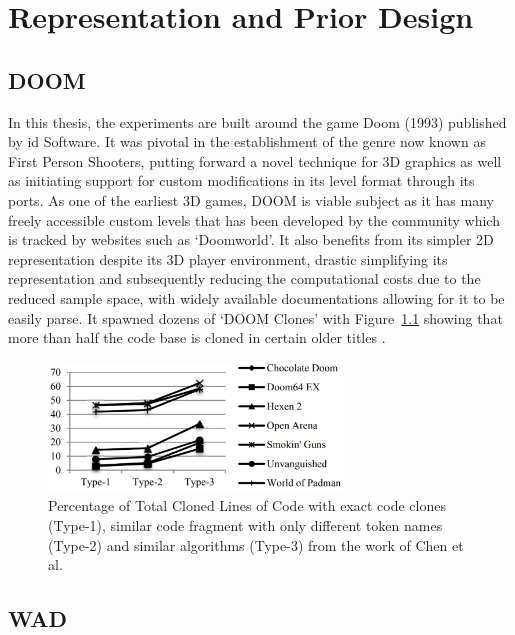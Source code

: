 \documentclass{Configuration_Files/PoliMi3i_thesis}
\begin{document}
\chapter{Representation and Prior Design}
\label{ch:representation and prior design}%

\section{DOOM}
In this thesis, the experiments are built around the game Doom (1993) published 
by id Software. It was pivotal in the establishment of the genre now known as First 
Person Shooters, putting forward a novel technique for 3D graphics as well as 
initiating support for custom modifications in its level format through its ports. As 
one of the earliest 3D games, DOOM is viable subject as it has many freely accessible 
custom levels that has been developed by the community which is tracked by
websites such as ‘Doomworld’. It also benefits from its simpler 2D representation 
despite its 3D player environment, drastic simplifying its representation and 
subsequently reducing the computational costs due to the reduced sample space, 
with widely available documentations allowing for it to be easily parse. It spawned 
dozens of ‘DOOM Clones’ with Figure~\ref{fig:doomclones} showing that more than half the code base is 
cloned in certain older titles \cite{YaC14}.
\begin{figure}[H]
    \centering
    \includegraphics[width=0.7\textwidth]{doom_clones.jpg}
    \caption[Cloned lines of code for C-based from the work of Chen et al.]{Percentage of Total Cloned Lines of Code with exact code clones (Type-1), similar code fragment with only different token names (Type-2) and similar algorithms (Type-3) from the work of Chen et al.}
    \label{fig:doomclones}
\end{figure}

\section{WAD}
\end{document}
